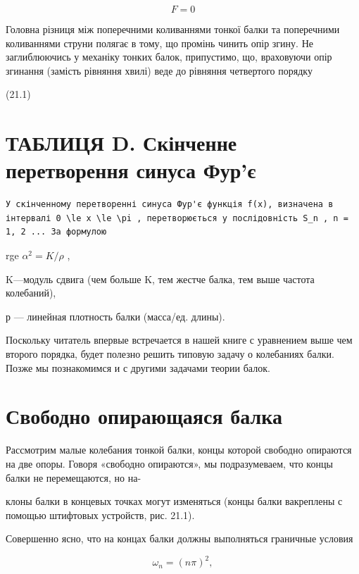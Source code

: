 \documentclass[
  ukrainian,
]{article}
\begin{document}
\[
F = 0
\]

Головна різниця між поперечними коливаннями тонкої балки та поперечними
коливаннями струни полягає в тому, що промінь чинить опір згину. Не
заглиблюючись у механіку тонких балок, припустимо, що, враховуючи опір
згинання (замість рівняння хвилі) веде до рівняння четвертого порядку

(21.1)

\section{ТАБЛИЦЯ D. Скінченне перетворення синуса
Фур'є}\label{ux442ux430ux431ux43bux438ux446ux44f-d.-ux441ux43aux456ux43dux447ux435ux43dux43dux435-ux43fux435ux440ux435ux442ux432ux43eux440ux435ux43dux43dux44f-ux441ux438ux43dux443ux441ux430-ux444ux443ux440ux454}

\begin{verbatim}
У скінченному перетворенні синуса Фур'є функція f(x), визначена в інтервалі 0 \le x \le \pi , перетворюється у послідовність S_n , n = 1, 2 ... За формулою
\end{verbatim}

rge \(\alpha^2 = K/\rho\) ,

K---модуль сдвига (чем больше K, тем жестче балка, тем выше частота
колебаний),

р --- линейная плотность балки (масса/ед. длины).

Поскольку читатель впервые встречается в нашей книге с уравнением выше
чем второго порядка, будет полезно решить типовую задачу о колебаниях
балки. Позже мы познакомимся и с другими задачами теории балок.

\section{Свободно опирающаяся
балка}\label{ux441ux432ux43eux431ux43eux434ux43dux43e-ux43eux43fux438ux440ux430ux44eux449ux430ux44fux441ux44f-ux431ux430ux43bux43aux430}

Рассмотрим малые колебания тонкой балки, концы которой свободно
опираются на две опоры. Говоря «свободно опираются», мы подразумеваем,
что концы балки не перемещаются, но на-

клоны балки в концевых точках могут изменяться (концы балки вакреплены с
помощью штифтовых устройств, рис. 21.1).

Совершенно ясно, что на концах балки должны выполняться граничные
условия

\[
\omega_n = (n\pi)^2,
\]
\end{document}
